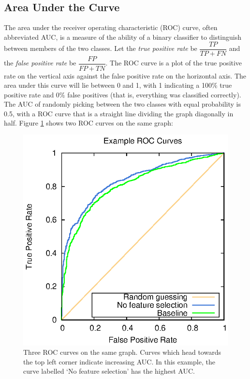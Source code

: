 \subsection{Area Under the Curve}
The area under the receiver operating characteristic (ROC) curve, often
abbreviated AUC, is a measure of the ability of a binary classifier to
distinguish between members of the two classes. Let the \textit{true
positive rate} be $\dfrac{TP}{TP + FN}$ and the \textit{false positive rate}
be $\dfrac{FP}{FP + TN}$. The ROC curve is a plot of the true positive rate
on the vertical axis against the false positive rate on the horizontal axis.
The area under this curve will lie between 0 and 1, with 1 indicating a
100\% true positive rate and 0\% false positives (that is, everything was
classified correctly). The AUC of randomly picking between the two classes
with equal probability is 0.5, with a ROC curve that is a straight line
dividing the graph diagonally in half. Figure \ref{fig:sampleroc} shows
two ROC curves on the same graph:

\begin{figure}[h]
\centering
\includegraphics{images/method/example-roc.eps}
\caption{Three ROC curves on the same graph. Curves
which head towards the top left corner indicate increasing AUC. In this
example, the curve labelled `No feature selection' has the highest AUC.}
\label{fig:sampleroc}
\end{figure}

